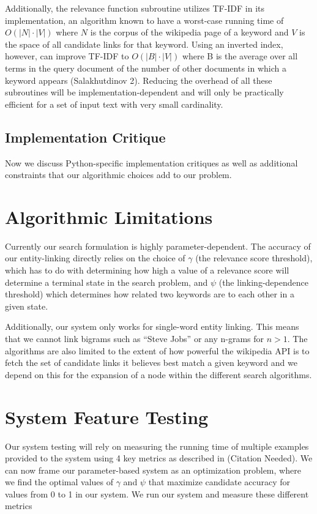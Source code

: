 \documentclass[twoside,11pt]{article}
\begin{document}
Additionally, the relevance function subroutine utilizes TF-IDF in its implementation, an algorithm known to have a worst-case running time of $O(|N|\cdot|V|)$ where $N$ is the corpus of the wikipedia page of a keyword and $V$ is the space of all candidate links for that keyword. Using an inverted index, however, can improve TF-IDF to $O(|B|\cdot|V|)$ where B is the average over all terms in the query document of the number of other documents
in which a keyword appears (Salakhutdinov 2). Reducing the overhead of all these subroutines will be implementation-dependent and will only be practically efficient for a set of input text with very small cardinality.

\subsection{Implementation Critique}
Now we discuss Python-specific implementation critiques as well as additional constraints that our algorithmic choices add to our problem.
\section{Algorithmic Limitations}
Currently our search formulation is highly parameter-dependent. The accuracy of our entity-linking directly relies on the choice of $\gamma$ (the relevance score threshold), which has to do with determining how high a value of a relevance score will determine a terminal state in the search problem, and $\psi$ (the linking-dependence threshold) which determines how related two keywords are to each other in a given state.

Additionally, our system only works for single-word entity linking. This means that we cannot link bigrams such as ``Steve Jobs'' or any n-grams for $n > 1$. The algorithms are also limited to the extent of how powerful the wikipedia API is to fetch the set of candidate links it believes best match a given keyword and we depend on this for the expansion of a node within the different search algorithms.

\section{System Feature Testing}

Our system testing will rely on measuring the running time of multiple examples provided to the system using 4 key metrics as described in (Citation Needed). We can now frame our parameter-based system as an optimization problem, where we find the optimal values of $\gamma$ and $\psi$ that maximize candidate accuracy for values from 0 to 1 in our system. We run our system and measure these different metrics
\end{document}
